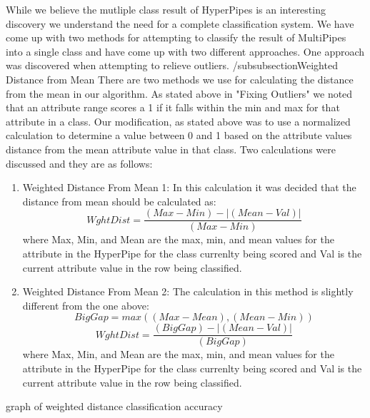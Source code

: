 While we believe the mutliple class result of HyperPipes is 
an interesting discovery we understand the need for a complete 
classification system. We have come up with two methods for
attempting to classify the result of MultiPipes into a single 
class and have come up with two different approaches. One 
approach was discovered when attempting to relieve outliers.
/subsubsection{Weighted Distance from Mean}
There are two methods we use for calculating the distance from 
the mean in our algorithm. As stated above in "Fixing Outliers" 
we noted that an attribute range scores a 1 if it falls within 
the min and max for that attribute in a class. Our modification, 
as stated above was to use a normalized calculation to determine 
a value between 0 and 1 based on the attribute values distance 
from the mean attribute value in that class. Two calculations 
were discussed and they are as follows:
\begin{enumerate}
\item Weighted Distance From Mean 1: In this calculation it was 
decided that the distance from mean should be calculated as:
\begin{equation}
  WghtDist=\frac{(Max-Min)-|(Mean-Val)|}{(Max-Min)}
\end{equation}
where Max, Min, and Mean are the max, min, and mean values for 
the attribute in the HyperPipe for the class currenlty being 
scored and Val is the current attribute value in the row being 
classified. 
\item Weighted Distance From Mean 2: The calculation in this 
method is slightly different from the one above:
\begin{equation}
  BigGap = max((Max-Mean),(Mean-Min))
\end{equation}
\begin{equation}
  WghtDist=\frac{(BigGap)-|(Mean-Val)|}{(BigGap)}
\end{equation}
where Max, Min, and Mean are the max, min, and mean values for 
the attribute in the HyperPipe for the class currenlty being 
scored and Val is the current attribute value in the row being 
classified.
\end{enumerate}



graph of weighted distance classification accuracy

